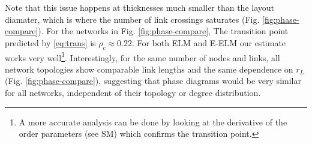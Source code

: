 \documentclass[nofootinbib,preprint,floatfix,endfloats]{revtex4} %
\begin{document}
Note that this issue happens at thicknesses much smaller than the layout diamater, which is where the number of link crossings saturates (Fig. \ref{fig:phase-compare}).
For the networks in Fig. \ref{fig:phase-compare}, The transition point
predicted by \eqref{eq:trans} is 
    $\rho_c \approx 0.22$.
For both ELM and E-ELM our estimate works very well\footnote{A more accurate analysis can be done by looking at the derivative of the order parameters (see SM) which confirms the transition point.}. 
Interestingly, for the same number of nodes and links, all network topologies show comparable link lengths and the same dependence on $r_L$ (Fig. \ref{fig:phase-compare}), 
suggesting that phase diagrams would be very similar for all networks, independent of their topology or degree distribution.
 

\end{document}
